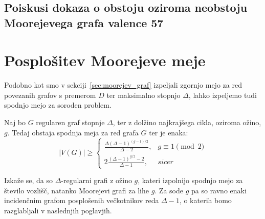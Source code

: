 \documentclass[fin1, tisk]{fmfdelo}
\begin{document}
\begin{dokaz}

\end{dokaz}
 
\subsection{Poiskusi dokaza o obstoju oziroma neobstoju Moorejevega grafa valence 57}

\section{Posplošitev Moorejeve meje}
Podobno kot smo v sekciji~\ref{sec:moorejev_graf} izpeljali 
zgornjo mejo za red povezanih grafov s premerom $D$ ter 
maksimalno stopnjo $\Delta$, lahko izpeljemo tudi spodnjo mejo 
za soroden problem.

\begin{trditev}
Naj bo $G$ regularen graf stopnje $\Delta$, ter z dolžino 
najkrajšega cikla, oziroma ožino, $g$. Tedaj obstaja spodnja meja 
za red grafa $G$ ter je enaka:
\begin{equation}
    |V(G)| \geq \begin{cases}
    \frac{\Delta(\Delta - 1)^{(g-1)/2}}{\Delta - 2}, & g \equiv 1 \pmod 2\\
    2\frac{(\Delta - 1)^{g/2} - 2}{\Delta - 1}, & sicer
    \end{cases}
\end{equation}
\end{trditev}

\begin{dokaz}
    
\end{dokaz}

\begin{opomba}
Izkaže se, da so $\Delta$-regularni grafi
z ožino $g$, kateri izpolnijo spodnjo mejo za število vozlišč,
natanko Moorejevi grafi za lihe $g$. Za sode $g$ pa so ravno 
enaki incidenčnim grafom posplošenih večkotnikov reda $\Delta -1$,
o katerih bomo razglabljali v naslednjih poglavjih.
\end{opomba}

\begin{dokaz}
    
\end{dokaz}

\end{document}
